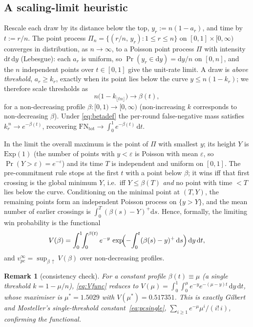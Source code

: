 \documentclass[11pt]{article}
\newtheorem{remark}{Remark}
\begin{document}
\subsection{A scaling-limit heuristic}\label{sec:scaling}

Rescale each draw by its distance below the top, $y_r:=n(1-a_r)$, and time by $t:=r/n$.
The point process $\Pi_n=\{(r/n,\,y_r):1\le r\le n\}$ on $[0,1]\times[0,\infty)$ converges
in distribution, as $n\to\infty$, to a Poisson point process $\Pi$ with intensity
$\mathrm{d}t\,\mathrm{d}y$ (Lebesgue): each $a_r$ is uniform, so $\Pr(y_r\in\mathrm{d}y)=
\mathrm{d}y/n$ on $[0,n]$, and the $n$ independent points over $t\in[0,1]$ give the
unit-rate limit. A draw is \emph{above threshold}, $a_r\ge k_r$, exactly when its point
lies below the curve $y\le n(1-k_r)$; we therefore scale thresholds as
\begin{equation}\label{eq:betadef}
  n\bigl(1-k_{\lfloor tn\rfloor}\bigr)\longrightarrow \beta(t),
\end{equation}
for a non-decreasing profile $\beta:[0,1)\to[0,\infty)$ (non-increasing $k$ corresponds
to non-decreasing $\beta$). Under \eqref{eq:betadef} the per-round false-negative mass
satisfies $k_r^{\,n}\to e^{-\beta(t)}$, recovering $\mathrm{FN}_{\mathrm{tot}}\to
\int_0^1 e^{-\beta(t)}\,\mathrm{d}t$.

In the limit the overall maximum is the point of $\Pi$ with smallest $y$; its height
$Y$ is $\mathrm{Exp}(1)$ (the number of points with $y<\varepsilon$ is Poisson with mean
$\varepsilon$, so $\Pr(Y>\varepsilon)=e^{-\varepsilon}$) and its time $T$ is independent
and uniform on $[0,1]$. The pre-commitment rule stops at the first $t$ with a point below
$\beta$; it wins iff that first crossing is the global minimum $Y$, i.e.\ iff $Y\le
\beta(T)$ \emph{and} no point with time $<T$ lies below the curve. Conditioning on the
minimal point at $(T,Y)$, the remaining points form an independent Poisson process on
$\{y>Y\}$, and the mean number of earlier crossings is $\int_0^T(\beta(s)-Y)^+\mathrm{d}s$.
Hence, formally, the limiting win probability is the functional
\begin{equation}\label{eq:Vfunc}
  V(\beta)=\int_0^1\!\!\int_0^{\beta(t)} e^{-y}\,
            \exp\!\Bigl(-\!\int_0^t(\beta(s)-y)^+\,\mathrm{d}s\Bigr)\,\mathrm{d}y\,\mathrm{d}t ,
\end{equation}
and $v_{pc}^\infty=\sup_{\beta\,\uparrow} V(\beta)$ over non-decreasing profiles.

\begin{remark}[consistency check]
For a constant profile $\beta(t)\equiv\mu$ (a single threshold $k=1-\mu/n$),
\eqref{eq:Vfunc} reduces to $V(\mu)=\int_0^1\!\int_0^{\mu}e^{-y}e^{-(\mu-y)t}\,
\mathrm{d}y\,\mathrm{d}t$, whose maximiser is $\mu^\ast=1.5029$ with
$V(\mu^\ast)=0.517351$. This is exactly Gilbert and Mosteller's single-threshold
constant~\eqref{eq:pcsingle}, $\sum_{i\ge1}e^{-\mu}\mu^i/(i!\,i)$, confirming the
functional.
\end{remark}
\end{document}
